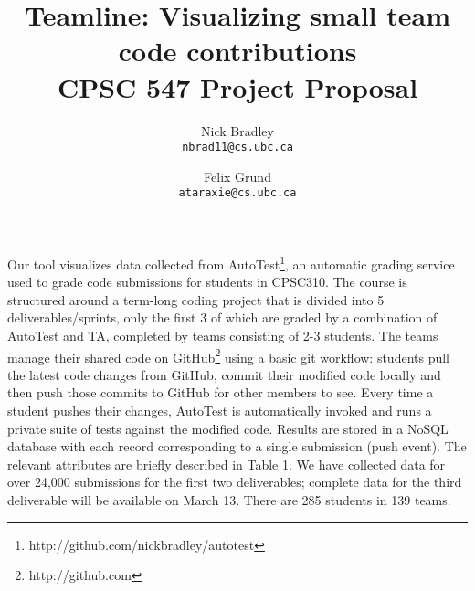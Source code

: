 \documentclass[preprint,journal]{vgtc}       %
\title{Teamline: Visualizing small team code contributions \\ \large CPSC 547 Project Proposal}
\author{
  Nick Bradley\\   \texttt{nbrad11@cs.ubc.ca}
  \and
  Felix Grund\\    \texttt{ataraxie@cs.ubc.ca}
}
\begin{document}


\maketitle


Our tool visualizes data collected from AutoTest\footnote{http://github.com/nickbradley/autotest},
an automatic grading service used to grade code submissions for students in
CPSC310. The course is structured around a term-long coding project that is
divided into 5 deliverables/sprints, only the first 3 of which are graded by a
combination of AutoTest and TA, completed by teams consisting of 2-3 students.
The teams manage their shared code on GitHub\footnote{http://github.com}
using a basic git workflow: students pull the latest code changes from GitHub,
commit their modified code locally and then push those commits to GitHub for
other members to see. Every time a student pushes their changes, AutoTest is
automatically invoked and runs a private suite of tests against the modified
code. Results are stored in a NoSQL database with each record corresponding to a
single submission (push event). The relevant attributes are briefly described in
Table 1. We have collected data for over 24,000 submissions for the first two
deliverables; complete data for the third deliverable will be available on March
13. There are 285 students in 139 teams.
\end{document}
